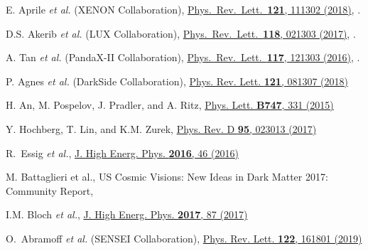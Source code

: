 \begin{thebibliography}{100}



E. Aprile {\it et al.} (XENON Collaboration),
\href{\DOI/10.1103/PhysRevLett.121.111302}{Phys.\ Rev.\ Lett.\ {\bf 121}, 111302 (2018)}, .

D.S. Akerib {\it et al.} (LUX Collaboration),
\href{\DOI/10.1103/PhysRevLett.118.021303}{Phys.\ Rev.\ Lett.\ {\bf 118}, 021303 (2017)}, .

A. Tan {\it et al.} (PandaX-II Collaboration),
\href{\DOI/10.1103/PhysRevLett.117.121303}{Phys.\ Rev.\ Lett.\ \textbf{117}, 121303 (2016)}, .

    P. Agnes {\it et al.} (DarkSide Collaboration),
  \href{\DOI/10.1103/PhysRevLett.121.081307}{Phys. Rev. Lett. {\bf 121}, 081307 (2018)} 



H. An, M. Pospelov, J. Pradler, and A. Ritz, 
\href{\DOI/10.1016/j.physletb.2015.06.018}{Phys. Lett. {\bf B747}, 331 (2015)} 

  Y. Hochberg, T. Lin, and K.M. Zurek,
  \href{\DOI/10.1103/PhysRevD.95.023013}{Phys. Rev. D {\bf95}, 023013 (2017)} 

   R.~Essig {\it et al.},
  \href{\DOI/10.1007/JHEP05(2016)046}{J. High Energ. Phys. {\bf 2016}, 46 (2016)} 
  
M. Battaglieri et al., {US Cosmic Visions: New Ideas in Dark Matter 2017: Community Report},
  
 I.M. Bloch {\it et al.},  
  \href{\DOI/10.1007/JHEP06(2017)087}{J. High Energ. Phys. {\bf2017}, 87 (2017)} 



O.~Abramoff {\it et al.} (SENSEI Collaboration),
\href{\DOI/10.1103/PhysRevLett.122.161801}{Phys. Rev. Lett. {\bf 122}, 161801 (2019)} 
  

\end{thebibliography}
